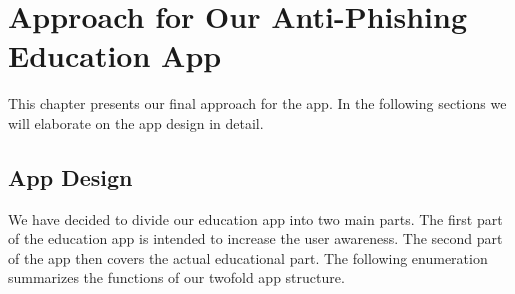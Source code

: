 
\section{Approach for Our Anti-Phishing Education App}
\label{s:approach}
This chapter presents our final approach for the app.
 In the following sections we will elaborate on the app design in detail.

\subsection{App Design}
\label{s:app_design}
We have decided to divide our education app into two main parts.
 The first part of the education app is intended to increase the user awareness.
 The second part of the app then covers the actual educational part.
 The following enumeration summarizes the functions of our twofold app structure.

